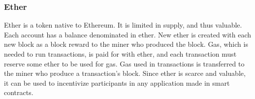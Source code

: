 \subsubsection{Ether}
Ether is a token native to Ethereum. It is limited in supply, and thus valuable. Each account has a balance denominated in ether. New ether is created with each new block as a block reward to the miner who produced the block. Gas, which is needed to run transactions, is paid for with ether, and each transaction must reserve some ether to be used for gas. Gas used in transactions is transferred to the miner who produce a transaction's block. Since ether is scarce and valuable, it can be used to incentivize participants in any application made in smart contracts. 